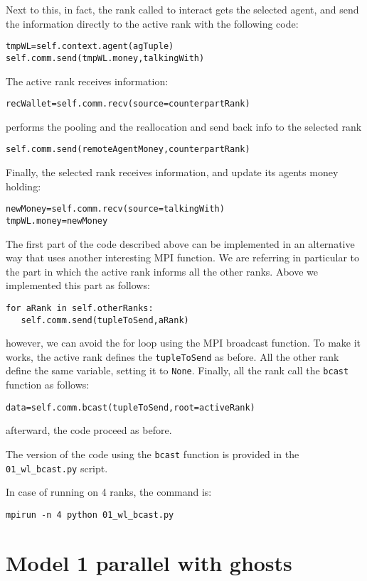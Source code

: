 \documentclass{article}
\begin{document}
Next to this, in fact, the rank called to interact gets the selected agent, and send the information directly to the active rank with the following code:
\begin{verbatim}
tmpWL=self.context.agent(agTuple)
self.comm.send(tmpWL.money,talkingWith)
\end{verbatim}             

The active rank receives information:
\begin{verbatim}
recWallet=self.comm.recv(source=counterpartRank)
\end{verbatim}
performs the pooling and the reallocation and send back info to the selected rank
\begin{verbatim}
self.comm.send(remoteAgentMoney,counterpartRank)
\end{verbatim}
Finally, the selected rank receives information, and update its agents money holding:
\begin{verbatim}
newMoney=self.comm.recv(source=talkingWith)
tmpWL.money=newMoney
\end{verbatim}

The first part of the code described above can be implemented in an alternative way that uses another interesting MPI function.
We are referring in particular to the part in which the active rank informs all the other ranks. Above we implemented this part as follows:
\begin{verbatim}
for aRank in self.otherRanks:
   self.comm.send(tupleToSend,aRank)
\end{verbatim}
however, we can avoid the for loop using the MPI broadcast function.
To make it works, the active rank defines the \verb+tupleToSend+ as before. All the other rank define the same variable, setting it to \verb+None+.
Finally, all the rank call the \verb+bcast+ function as follows:
\begin{verbatim}
data=self.comm.bcast(tupleToSend,root=activeRank)
\end{verbatim}
afterward, the code proceed as before.

The version of the code using the \verb+bcast+ function is provided in the \verb+01_wl_bcast.py+ script.

In case of running on 4 ranks, the command is:
\begin{verbatim}
mpirun -n 4 python 01_wl_bcast.py
\end{verbatim}

\section{Model 1 parallel with ghosts}
\end{document}

